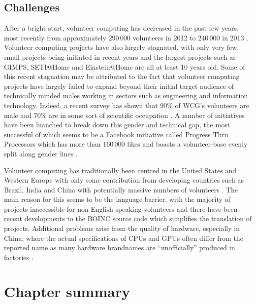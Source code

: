 \subsection{Challenges}
After a bright start, volunteer computing has decreased in the past few years, most recently from approximately $290\,000$ volunteers in 2012 to $240\,000$ in 2013 \cite{anderson2013}. Volunteer computing projects have also largely stagnated, with only very few, small projects being initiated in recent years  and the largest projects such as GIMPS, SETI@Home and Einstein@Home are all at least 10 years old. Some of this recent stagnation may be attributed to the fact that volunteer computing projects have largely failed to expand beyond their initial target audience of technically minded males working in sectors such as engineering and information technology. Indeed, a recent survey has shown that 90\% of WCG's volunteers are male and 70\% are in some sort of scientific occupation \cite{wcg2013}. A number of initiatives have been luanched to break down this gender and technical gap, the most successful of which seems to be a Facebook \cite{facebook} initiative called Progress Thru Processors which has more than $160\,000$ likes and boasts a volunteer-base evenly split along gender lines \cite{ptp2013}.

Volunteer computing has traditionally been centred in the United States and Western Europe with only some contribution  from developing countries such as Brazil, India and China with potentially massive numbers of volunteers \cite{wcg2013}. The main reason for this seems to be the language barrier, with the majority of projects inaccessible for non-English-speaking volunteers \cite{china2013} and there have been recent developments to the BOINC source code which simplifies the translation of projects. Additional problems arise from the quality of hardware, especially in China, where the actual specifications of CPUs and GPUs often differ from the reported name as many hardware brandnames are ``unofficially'' produced in factories \cite{keith}. 

 



\section{Chapter summary}